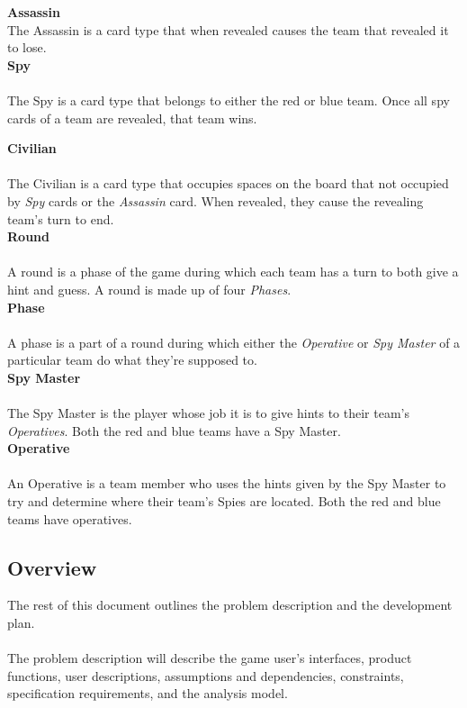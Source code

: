 \documentclass[10pt, a4paper]{article}
\begin{document}
		\textbf{Assassin} \\
		The Assassin is a card type that when revealed causes the team that revealed it to lose.\\
		
		\textbf{Spy}\\
		\\
		The Spy is a card type that belongs to either the red or blue team. Once all spy cards of a team are revealed, that team wins.
		
		\textbf{Civilian}\\
		\\
		The Civilian is a card type that occupies spaces on the board that not occupied by \textit{Spy} cards or the \textit{Assassin} card. When revealed, they cause the revealing team's turn to end. \\
	
	\textbf{Round}\\
		\\
	A round is a phase of the game during which each team has a turn to both give a hint and guess. A round is made up of four \textit{Phases}.\\
	
	\textbf{Phase}\\
		\\
		A phase is a part of a round during which either the \textit{Operative} or \textit{Spy Master} of a particular team do what they're supposed to.\\
		
		\textbf{Spy Master}\\
		\\
		The Spy Master is the player whose job it is to give hints to their team's \textit{Operatives}. Both the red and blue teams have a Spy Master.\\
		
		\textbf{Operative}\\
		\\
		An Operative is a team member who uses the hints given by the Spy Master to try and determine where their team's Spies are located. Both the red and blue teams have operatives.\\
	
	\subsection{Overview}
	
	The rest of this document outlines the problem description and the development plan. \\ 
	\\  
	The problem description will describe the game user's interfaces, product functions, user descriptions, assumptions and dependencies, constraints, specification requirements, and the analysis model. \\  
	
\end{document}
